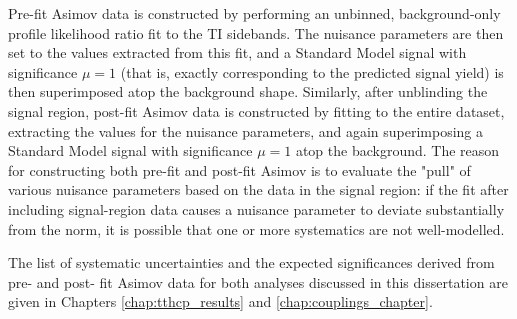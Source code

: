 Pre-fit Asimov data is constructed by performing an unbinned, background-only profile likelihood ratio fit to the TI sidebands. The nuisance parameters are then set to the values extracted from this fit, and a Standard Model signal with significance $\mu = 1$ (that is, exactly corresponding to the predicted signal yield) is then superimposed atop the background shape. Similarly, after unblinding the signal region, post-fit Asimov data is constructed by fitting to the entire dataset, extracting the values for the nuisance parameters, and again superimposing a Standard Model signal with significance $\mu = 1$ atop the background. The reason for constructing both pre-fit and post-fit Asimov is to evaluate the "pull" of various nuisance parameters based on the data in the signal region: if the fit after including signal-region data causes a nuisance parameter to deviate substantially from the norm, it is possible that one or more systematics are not well-modelled.

The list of systematic uncertainties and the expected significances derived from pre- and post- fit Asimov data for both analyses discussed in this dissertation are given in Chapters \ref{chap:tthcp_results} and \ref{chap:couplings_chapter}.
